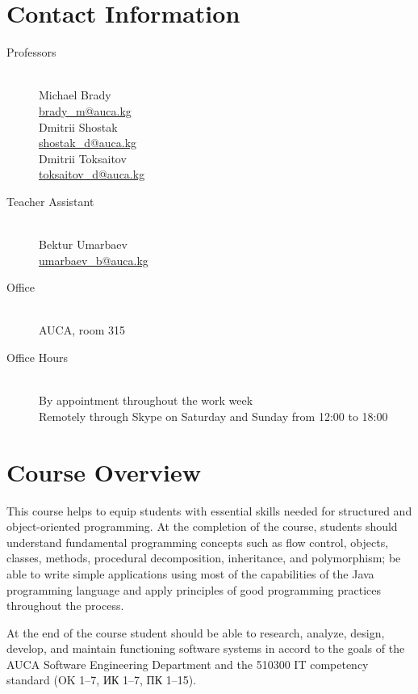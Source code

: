 \documentclass[12pt,a4paper,oneside]{article}
\begin{document}
    \section{Contact Information}

        \begin{description}
            \item[Professors]\hfill\\
                Michael Brady\\
                \href{mailto:brady_m@auca.kg}{brady\_m@auca.kg}\\
                Dmitrii Shostak\\
                \href{mailto:shostak_d@auca.kg}{shostak\_d@auca.kg}\\
                Dmitrii Toksaitov\\
                \href{mailto:toksaitov_d@auca.kg}{toksaitov\_d@auca.kg}
            \item[Teacher Assistant]\hfill\\
                Bektur Umarbaev\\
                \href{mailto:umarbaev_b@auca.kg}{umarbaev\_b@auca.kg}
            \item[Office]\hfill\\
                AUCA, room 315
            \item[Office Hours]\hfill\\
                By appointment throughout the work week\\
                Remotely through Skype on Saturday and Sunday from 12:00 to 18:00
        \end{description}

    \section{Course Overview}

        This course helps to equip students with essential skills needed for structured and object-oriented programming. At the completion of the course, students should understand fundamental programming concepts such as flow control, objects, classes, methods, procedural decomposition, inheritance, and polymorphism; be able to write simple applications using most of the capabilities of the Java programming language and apply principles of good programming practices throughout the process.

        At the end of the course student should be able to research, analyze, design, develop, and maintain functioning software systems in accord to the goals of the AUCA Software Engineering Department and the 510300 IT competency standard (OK 1–7, ИК 1–7, ПК 1–15).
\end{document}
